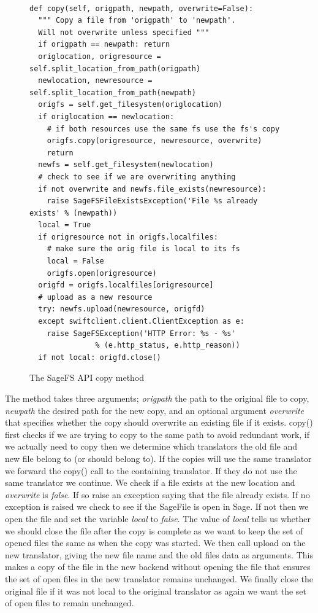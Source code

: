 \begin{figure}[h]
\begin{lstlisting}

def copy(self, origpath, newpath, overwrite=False):
  """ Copy a file from 'origpath' to 'newpath'.
  Will not overwrite unless specified """
  if origpath == newpath: return
  origlocation, origresource = self.split_location_from_path(origpath)
  newlocation, newresource = self.split_location_from_path(newpath)
  origfs = self.get_filesystem(origlocation)
  if origlocation == newlocation:
    # if both resources use the same fs use the fs's copy
    origfs.copy(origresource, newresource, overwrite)
    return
  newfs = self.get_filesystem(newlocation)
  # check to see if we are overwriting anything
  if not overwrite and newfs.file_exists(newresource):
    raise SageFSFileExistsException('File %s already exists' % (newpath))
  local = True
  if origresource not in origfs.localfiles:
    # make sure the orig file is local to its fs
    local = False
    origfs.open(origresource)
  origfd = origfs.localfiles[origresource]
  # upload as a new resource
  try: newfs.upload(newresource, origfd)
  except swiftclient.client.ClientException as e:
    raise SageFSException('HTTP Error: %s - %s' 
               % (e.http_status, e.http_reason))
  if not local: origfd.close() 

\end{lstlisting}
\caption{The SageFS API copy method}
\label{fig:sagecopy}
\end{figure}

The method takes three arguments; \textit{origpath} the path to the original file to copy, \textit{newpath} the desired path for the new copy, and an optional argument \textit{overwrite} that specifies whether the copy should overwrite an existing file if it exists. copy() first checks if we are trying to copy to the same path to avoid redundant work, if we actually need to copy then we determine which translators the old file and new file belong to (or should belong to). If the copies will use the same translator we forward the copy() call to the containing translator. If they do not use the same translator we continue. We check if a file exists at the new location and \textit{overwrite} is \textit{false}. If so raise an exception saying that the file already exists. If no exception is raised we check to see if the SageFile is open in Sage. If not then we open the file and set the variable \textit{local} to \textit{false}. The value of \textit{local} tells us whether we should close the file after the copy is complete as we want to keep the set of opened files the same as when the copy was started. We then call upload on the new translator, giving the new file name and the old files data as arguments. This makes a copy of the file in the new backend without opening the file that ensures the set of open files in the new translator remains unchanged. We finally close the original file if it was not local to the original translator as again we want the set of open files to remain unchanged.

